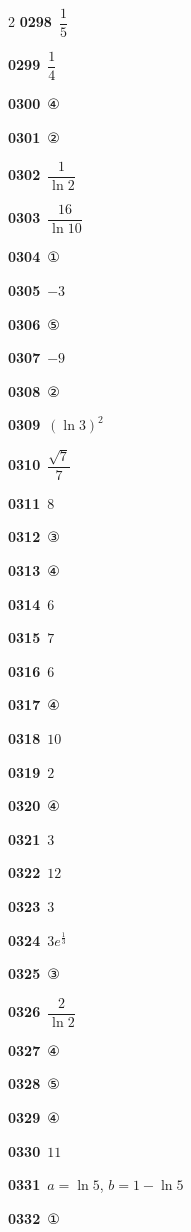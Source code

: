 \documentclass[10pt,a4paper]{article}
\begin{document}
\begin{multicols}{2}
\noindent\textbf{0298}\ $\dfrac{1}{5}$\par
\noindent\textbf{0299}\ $\dfrac{1}{4}$\par
\noindent\textbf{0300}\ ④\par
\noindent\textbf{0301}\ ②\par
\noindent\textbf{0302}\ $\dfrac{1}{\ln 2}$\par
\noindent\textbf{0303}\ $\dfrac{16}{\ln 10}$\par
\noindent\textbf{0304}\ ①\par
\noindent\textbf{0305}\ $-3$\par
\noindent\textbf{0306}\ ⑤\par
\noindent\textbf{0307}\ $-9$\par
\noindent\textbf{0308}\ ②\par
\noindent\textbf{0309}\ $(\ln 3)^2$\par
\noindent\textbf{0310}\ $\dfrac{\sqrt{7}}{7}$\par
\noindent\textbf{0311}\ $8$\par
\noindent\textbf{0312}\ ③\par
\noindent\textbf{0313}\ ④\par
\noindent\textbf{0314}\ $6$\par
\noindent\textbf{0315}\ $7$\par
\noindent\textbf{0316}\ $6$\par
\noindent\textbf{0317}\ ④\par
\noindent\textbf{0318}\ $10$\par
\noindent\textbf{0319}\ $2$\par
\noindent\textbf{0320}\ ④\par
\noindent\textbf{0321}\ $3$\par
\noindent\textbf{0322}\ $12$\par
\noindent\textbf{0323}\ $3$\par
\noindent\textbf{0324}\ $3e^{\frac{1}{3}}$\par
\noindent\textbf{0325}\ ③\par
\noindent\textbf{0326}\ $\dfrac{2}{\ln 2}$\par
\noindent\textbf{0327}\ ④\par
\noindent\textbf{0328}\ ⑤\par
\noindent\textbf{0329}\ ④\par
\noindent\textbf{0330}\ $11$\par
\noindent\textbf{0331}\ $a=\ln 5$, $b=1-\ln 5$\par
\noindent\textbf{0332}\ ①\par

\end{multicols}
\end{document}
